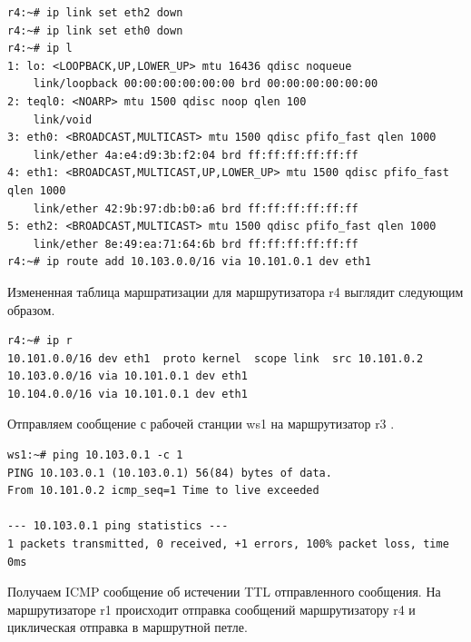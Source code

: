 \documentclass[a4paper,12pt]{article}
\begin{document}
\begin{Verbatim}
r4:~# ip link set eth2 down
r4:~# ip link set eth0 down
r4:~# ip l
1: lo: <LOOPBACK,UP,LOWER_UP> mtu 16436 qdisc noqueue 
    link/loopback 00:00:00:00:00:00 brd 00:00:00:00:00:00
2: teql0: <NOARP> mtu 1500 qdisc noop qlen 100
    link/void 
3: eth0: <BROADCAST,MULTICAST> mtu 1500 qdisc pfifo_fast qlen 1000
    link/ether 4a:e4:d9:3b:f2:04 brd ff:ff:ff:ff:ff:ff
4: eth1: <BROADCAST,MULTICAST,UP,LOWER_UP> mtu 1500 qdisc pfifo_fast qlen 1000
    link/ether 42:9b:97:db:b0:a6 brd ff:ff:ff:ff:ff:ff
5: eth2: <BROADCAST,MULTICAST> mtu 1500 qdisc pfifo_fast qlen 1000
    link/ether 8e:49:ea:71:64:6b brd ff:ff:ff:ff:ff:ff
r4:~# ip route add 10.103.0.0/16 via 10.101.0.1 dev eth1
\end{Verbatim}

Измененная таблица маршратизации для маршрутизатора r4 выглядит следующим образом.

\begin{Verbatim}
r4:~# ip r
10.101.0.0/16 dev eth1  proto kernel  scope link  src 10.101.0.2 
10.103.0.0/16 via 10.101.0.1 dev eth1 
10.104.0.0/16 via 10.101.0.1 dev eth1 
\end{Verbatim}

Отправляем сообщение с рабочей станции ws1 на маршрутизатор r3 .

\begin{Verbatim}
ws1:~# ping 10.103.0.1 -c 1
PING 10.103.0.1 (10.103.0.1) 56(84) bytes of data.
From 10.101.0.2 icmp_seq=1 Time to live exceeded

--- 10.103.0.1 ping statistics ---
1 packets transmitted, 0 received, +1 errors, 100% packet loss, time 0ms
\end{Verbatim}

Получаем ICMP сообщение об истечении TTL отправленного сообщения.
На маршрутизаторе r1 происходит отправка сообщений маршрутизатору r4 и циклическая отправка в маршрутной петле.
\end{document}
